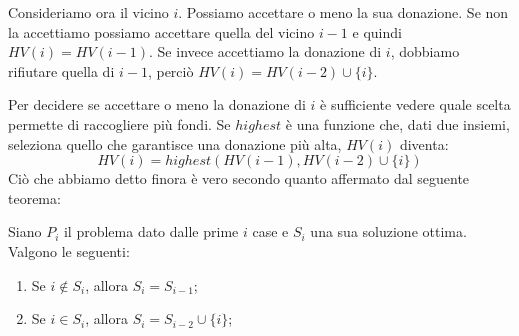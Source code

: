 Consideriamo ora il vicino $i$. Possiamo accettare o meno la sua donazione.
Se non la accettiamo possiamo accettare quella del vicino $i-1$ e quindi
$HV(i)=HV(i-1)$. Se invece accettiamo la donazione di $i$, dobbiamo rifiutare
quella di $i-1$, perciò $HV(i)=HV(i-2)\cup\{i\}$.

\noindent
Per decidere se accettare o meno la donazione di $i$ è sufficiente vedere
quale scelta permette di raccogliere più fondi. Se $highest$ è una
funzione che, dati due insiemi, seleziona quello che garantisce una donazione
più alta, $HV(i)$ diventa:
\[HV(i)=highest\left(HV(i-1),HV(i-2)\cup\{i\}\right)\]
Ciò che abbiamo detto finora è vero secondo quanto affermato dal seguente teorema:
\begin{definition}
    Siano $P_i$ il problema dato dalle prime $i$ case e $S_i$ una sua soluzione
    ottima. Valgono le seguenti:
    \begin{enumerate}
        \item Se $i\notin S_i$, allora $S_i=S_{i-1}$;
        \item Se $i\in S_i$, allora $S_i=S_{i-2}\cup\{i\}$;
    \end{enumerate}
\end{definition}


